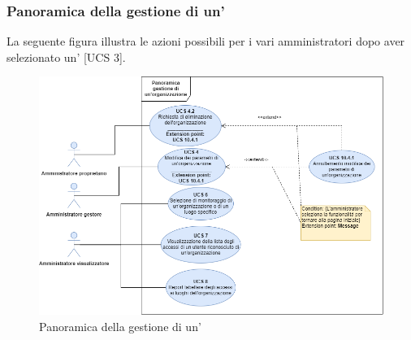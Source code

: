 \newpage
\subsubsection{Panoramica della gestione di un'}%
La seguente figura illustra le azioni possibili per i vari amministratori dopo aver selezionato un' [UCS 3].
\begin{figure}[h]
	\centering
    \includegraphics[scale=0.53]{Sezioni/UseCase/Immagini/PanoramicaGestioneOrganizzazione.png}
    \caption{Panoramica della gestione di un'}
\end{figure}